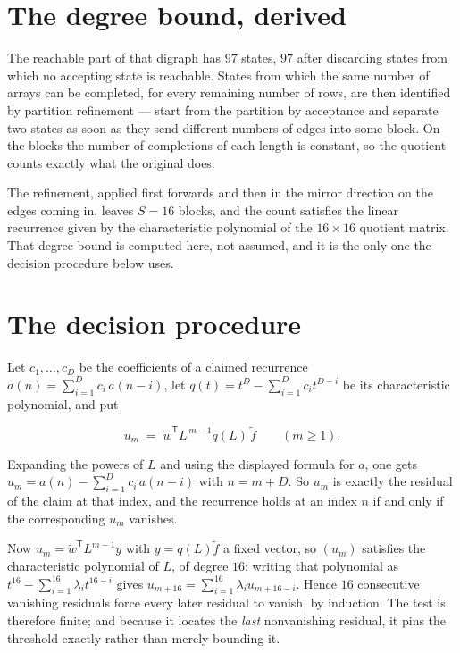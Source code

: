 \documentclass[11pt]{article}
\theoremstyle{definition}
\begin{document}
\section{The degree bound, derived}

The reachable part of that digraph has $97$ states, $97$ after discarding states from which no accepting state is reachable. States from which the same number of arrays can be completed, for every remaining number of rows, are then identified by partition refinement --- start from the partition by acceptance and separate two states as soon as they send different numbers of edges into some block. On the blocks the number of completions of each length is constant, so the quotient counts exactly what the original does.

The refinement, applied first forwards and then in the mirror direction on the edges coming in, leaves $S = 16$ blocks, and the count satisfies the linear recurrence given by the characteristic polynomial of the $16 \times 16$ quotient matrix. That degree bound is computed here, not assumed, and it is the only one the decision procedure below uses.

\section{The decision procedure}

Let $c_1,\dots,c_D$ be the coefficients of a claimed recurrence $a(n) = \sum_{i=1}^{D} c_i\,a(n-i)$, let $q(t) = t^{D} - \sum_{i=1}^{D} c_i t^{D-i}$ be its characteristic polynomial, and put

\[u_m \;=\; \tilde w^{\mathsf T} L^{\,m-1} q(L)\,\tilde f \qquad (m \ge 1).\]

Expanding the powers of $L$ and using the displayed formula for $a$, one gets $u_m = a(n) - \sum_{i=1}^{D} c_i\,a(n-i)$ with $n = m + D$. So $u_m$ is exactly the residual of the claim at that index, and the recurrence holds at an index $n$ if and only if the corresponding $u_m$ vanishes.

Now $u_m = \tilde w^{\mathsf T} L^{m-1} y$ with $y = q(L)\tilde f$ a fixed vector, so $(u_m)$ satisfies the characteristic polynomial of $L$, of degree $16$: writing that polynomial as $t^{16} - \sum_{i=1}^{16} \lambda_i t^{16-i}$ gives $u_{m+16} = \sum_{i=1}^{16} \lambda_i u_{m+16-i}$. Hence $16$ consecutive vanishing residuals force every later residual to vanish, by induction. The test is therefore finite; and because it locates the {\itshape last} nonvanishing residual, it pins the threshold exactly rather than merely bounding it.
\end{document}
